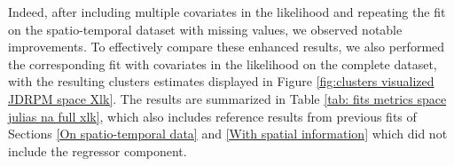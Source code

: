\documentclass[12pt,	%
	a4paper,		%
	twoside,		%
	openright,		%
	titlepage,%
	]{book}
\theoremstyle{definition}
\begin{document}
Indeed, after including multiple covariates in the likelihood and repeating the fit on the spatio-temporal dataset with missing values, we observed notable improvements. To effectively compare these enhanced results, we also performed the corresponding fit with covariates in the likelihood on the complete dataset, with the resulting clusters estimates displayed in Figure \ref{fig:clusters visualized JDRPM space Xlk}. The results are summarized in Table \ref{tab: fits metrics space julias na full xlk}, which also includes reference results from previous fits of Sections \ref{On spatio-temporal data} and \ref{With spatial information}  which did not include the regressor component. 
\end{document}
